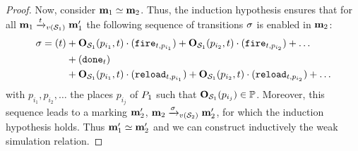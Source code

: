 \begin{proof}
  Now, consider $\mathbf{m}_1 \simeq \mathbf{m}_2$.
  Thus, the induction hypothesis ensures that for all $\mar_1 \fire[{\val[{\namePPN[1]}]}]{t} \mar'_1$ the following sequence of transitions $\seqt$ is enabled in $\mathbf{m}_2$:
  \begin{align*}
    \seqt = (t)
      &+ \outm[\namePPN[1]][p_{i_1},t] \cdot (\mathtt{fire}_{t,p_{i_1}})
       + \outm[\namePPN[1]][p_{i_2},t] \cdot (\mathtt{fire}_{t,p_{i_2}})
       + \dots \\
      &+ (\mathtt{done}_{t}) \\
      &+ \outm[\namePPN[1]][p_{i_1},t] \cdot (\mathtt{reload}_{t,p_{i_1}})
       + \outm[\namePPN[1]][p_{i_2},t] \cdot (\mathtt{reload}_{t,p_{i_2}})
       + \dots
  \end{align*}
  with $p_{i_1}, p_{i_2}, \dots$ the places $p_{i_j}$ of $P_1$ such that $\outm[\namePPN[1]][p_{i_j}] \in \parameters$.
  Moreover, this sequence leads to a marking $\mathbf{m}'_2$, $\mar_2 \fire[{\val[{\namePPN[2]}]}]{\seqt} \mar'_2$, for which the induction hypothesis holds.
  Thus $\mathbf{m}'_1 \simeq \mathbf{m}'_2$ and we can construct inductively the weak simulation relation.
\end{proof}

